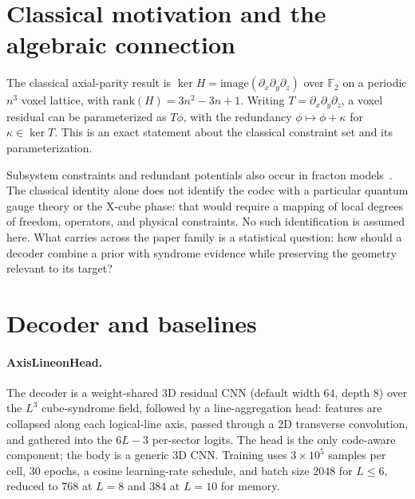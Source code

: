 \documentclass[11pt,a4paper]{article}
\begin{document}
\section{Classical motivation and the algebraic connection}
\label{sec:bridge}
The classical axial-parity result is
$\ker H=\mathrm{image}(\partial_x\partial_y\partial_z)$ over
$\mathbb{F}_2$ on a periodic $n^3$ voxel lattice, with
$\mathrm{rank}(H)=3n^2-3n+1$. Writing
$T=\partial_x\partial_y\partial_z$, a voxel residual can be parameterized
as $T\phi$, with the redundancy $\phi\mapsto\phi+\kappa$ for
$\kappa\in\ker T$. This is an exact statement about the classical
constraint set and its parameterization.

Subsystem constraints and redundant potentials also occur in fracton
models~\cite{vijay2016,pretko2017}. The classical identity alone does not
identify the codec with a particular quantum gauge theory or the X-cube
phase: that would require a mapping of local degrees of freedom, operators,
and physical constraints. No such identification is assumed here.
What carries across the paper family is a statistical question: how should
a decoder combine a prior with syndrome evidence while preserving the
geometry relevant to its target?

\section{Decoder and baselines}
\label{sec:methods}
\paragraph{AxisLineonHead.} The decoder is a weight-shared 3D
residual CNN (default width $64$, depth $8$) over the $L^3$ cube-syndrome
field, followed by a line-aggregation head: features are collapsed along
each logical-line axis, passed through a 2D transverse convolution, and
gathered into the $6L-3$ per-sector logits. The head is the only
code-aware component; the body is a generic 3D CNN. Training uses
$3{\times}10^5$ samples per cell, $30$ epochs, a cosine learning-rate
schedule, and batch size $2048$ for $L\le 6$, reduced to $768$ at $L=8$ and
$384$ at $L=10$ for memory.
\end{document}
